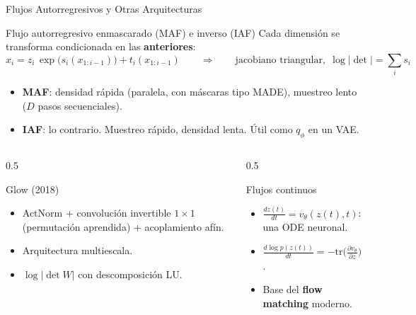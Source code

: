 \documentclass[aspectratio=169, 10pt]{beamer}
\begin{document}
\begin{frame}[shrink]{Flujos Autorregresivos y Otras Arquitecturas}

	\begin{block}{Flujo autorregresivo enmascarado (MAF) e inverso (IAF)}
		Cada dimensi\'on se transforma condicionada en las \textbf{anteriores}:
		\[
		x_i = z_i\, \exp\big(s_i(x_{1:i-1})\big) + t_i(x_{1:i-1})
		\qquad\Rightarrow\qquad
		\text{jacobiano triangular},\; \log|\det| = \textstyle\sum_i s_i
		\]
		\begin{itemize}
			\small
			\item \textbf{MAF}: densidad r\'apida (paralela, con m\'ascaras tipo MADE), muestreo lento ($D$ pasos secuenciales).
			\item \textbf{IAF}: lo contrario. Muestreo r\'apido, densidad lenta. \'Util como $q_\phi$ en un VAE.
		\end{itemize}
	\end{block}

	\vspace{0.2cm}

	\begin{columns}[T]
		\begin{column}{0.5\textwidth}
			\begin{block}{Glow (2018)}
				\small
				\begin{itemize}
					\item ActNorm + convoluci\'on invertible $1\times1$ (permutaci\'on aprendida) + acoplamiento af\'in.
					\item Arquitectura multiescala.
					\item $\log|\det W|$ con descomposici\'on LU.
				\end{itemize}
			\end{block}
		\end{column}

		\begin{column}{0.5\textwidth}
			\begin{block}{Flujos continuos}
				\small
				\begin{itemize}
					\item $\frac{dz(t)}{dt} = v_\theta(z(t), t)$: una ODE neuronal.
					\item $\frac{d \log p(z(t))}{dt} = -\mathrm{tr}\big(\frac{\partial v_\theta}{\partial z}\big)$.
					\item Base del \textbf{flow matching} moderno.
				\end{itemize}
			\end{block}
		\end{column}
	\end{columns}

\end{frame}
\end{document}
